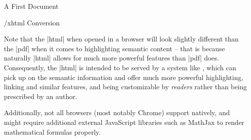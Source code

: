 \begin{sfragment}{A First \sTeX Document}
\begin{sfragment}{\omdoc/xhtml Conversion}
      \begin{remark}
          Note that the |html| when opened in a browser will
          look slightly different than the |pdf| when it comes
          to highlighting semantic content -- that is because
          naturally |html| allows for much more powerful
          features than |pdf| does. Consequently, the |html|
          is intended to be served by a system like \mmt,
          which can pick up on the semantic information and
          offer much more powerful highlighting, linking
          and similar features, and being customizable by
          \emph{readers} rather than being prescribed by an author.

          Additionally, not all browsers (most notably Chrome)
          support \mathml natively, and might require
          additional external JavaScript libraries such as
          MathJax to render mathematical formulas properly.
      \end{remark}
    \end{sfragment}
\end{sfragment}